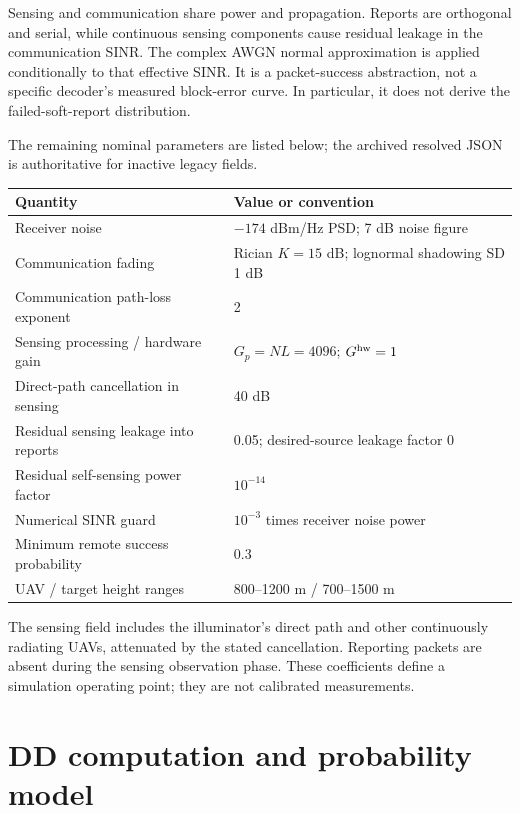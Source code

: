 \documentclass[10pt]{article}
\begin{document}
Sensing and communication share power and propagation. Reports are orthogonal
and serial, while continuous sensing components cause residual leakage in the
communication SINR. The complex AWGN normal approximation is applied
conditionally to that effective SINR. It is a packet-success abstraction,
not a specific decoder's measured block-error curve. In particular, it does
not derive the failed-soft-report distribution.

The remaining nominal parameters are listed below; the archived resolved JSON
is authoritative for inactive legacy fields.
\begin{center}\small
\begin{tabular}{ll}
\toprule
Quantity & Value or convention\\
\midrule
Receiver noise & $-174$ dBm/Hz PSD; 7 dB noise figure\\
Communication fading & Rician $K=15$ dB; lognormal shadowing SD 1 dB\\
Communication path-loss exponent & 2\\
Sensing processing / hardware gain & $G_p=NL=4096$; $G^{\rm hw}=1$\\
Direct-path cancellation in sensing & 40 dB\\
Residual sensing leakage into reports & 0.05; desired-source leakage factor 0\\
Residual self-sensing power factor & $10^{-14}$\\
Numerical SINR guard & $10^{-3}$ times receiver noise power\\
Minimum remote success probability & 0.3\\
UAV / target height ranges & 800--1200 m / 700--1500 m\\
\bottomrule
\end{tabular}
\end{center}
The sensing field includes the illuminator's direct path and other continuously
radiating UAVs, attenuated by the stated cancellation. Reporting packets are
absent during the sensing observation phase. These coefficients define a
simulation operating point; they are not calibrated measurements.

\section{DD computation and probability model}
\end{document}
